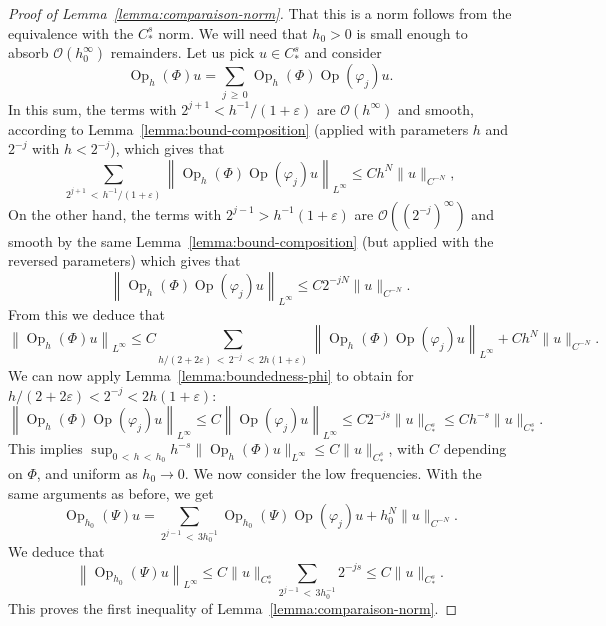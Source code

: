 \documentclass[10pt]{amsart}
\theoremstyle{definition}\newtheorem{defi}[theo]{Definition}\newtheorem{rema}[theo]{Remark}\newtheorem{exam}[theo]{Example}\newtheorem{exem}[theo]{Example}\newtheorem{nota}[theo]{Notation}
\newcommand{\eps}{\varepsilon}
\newcommand{\clO}{\mathcal{O}}
\DeclareMathOperator{\Op}{Op}
\begin{document}
\begin{proof}[Proof of Lemma~\ref{lemma:comparaison-norm}]
That this is a norm follows from the equivalence with the $C^s_\ast$ norm. We will need that $h_0>0$ is small enough to absorb $\clO(h_0^\infty)$ remainders. Let us pick $u\in C^s_\ast$ and consider
\[
\Op_h(\Phi) u= \sum_{j\,\geq\,0} \Op_h(\Phi) \Op(\varphi_j) u.
\]
In this sum, the terms with $2^{j+1}< h^{-1} /(1+\eps)$ are $\clO(h^\infty)$ and smooth, according to Lemma~\ref{lemma:bound-composition} (applied with parameters $h$ and $2^{-j}$ with $h < 2^{-j}$), which gives that
\[
\sum_{2^{j+1}\,<\,h^{-1}/(1+\eps)} \left\|\Op_h(\Phi) \Op(\varphi_j) u\right\|_{L^\infty} \leq C h^N \|u\|_{C^{-N}},
\]
On the other hand, the terms with $2^{j-1} > h^{-1}(1+\eps)$ are $\clO((2^{-j})^\infty)$ and smooth by the same Lemma~\ref{lemma:bound-composition} (but applied with the reversed parameters) which gives that
\[
\left\|\Op_h(\Phi) \Op(\varphi_j) u\right\|_{L^\infty} \leq C 2^{-jN} \|u\|_{C^{-N}}.
\]
From this we deduce that
\[
\left\|\Op_h(\Phi) u\right\|_{L^\infty} \leq C \sum_{h/(2+2\eps)\,<\,2^{-j}\,<\,2 h(1+\eps)} \left\| \Op_h(\Phi)\Op(\varphi_j) u\right\|_{L^\infty} + C h^N \|u\|_{C^{-N}}.
\]
We can now apply Lemma~\ref{lemma:boundedness-phi} to obtain for $h/(2+2\eps)< 2^{-j} < 2 h(1+\eps)$:
\[
\left\|\Op_h(\Phi)\Op(\varphi_j)u\right\|_{L^\infty} \leq C\left\|\Op(\varphi_j)u\right\|_{L^\infty} \leq C 2^{-js}\|u\|_{C^s_*} \leq C h^{-s}\|u\|_{C^s_*}.
\]
This implies $\sup_{0\,<\,h\,<\,h_0} h^{-s}\| \Op_h(\Phi)u \|_{L^\infty} \leq C \|u\|_{C^s_\ast}$, with $C$ depending on $\Phi$, and uniform as $h_0 \to 0$. We now consider the low frequencies. With the same arguments as before, we get
\[
\Op_{h_0}(\Psi)u = \sum_{2^{j-1}\,<\,3h_0^{-1}} \Op_{h_0}(\Psi) \Op(\varphi_j) u + h_0^N\|u\|_{C^{-N}}.
\]
We deduce that
\[
\left\| \Op_{h_0}(\Psi) u \right\|_{L^\infty} \leq C \| u\|_{C^s_\ast} \sum_{2^{j-1}\,< \,3h_0^{-1}} 2^{-js} \leq C \| u \|_{C^s_\ast}.
\]
This proves the first inequality of Lemma~\ref{lemma:comparaison-norm}.


\end{proof}
\end{document}
